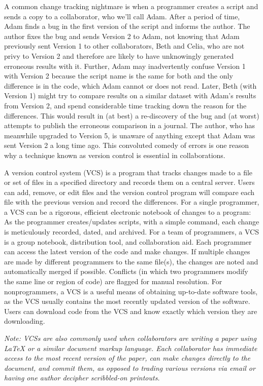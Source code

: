 \documentclass[ChapterTOCs,krantz2]{krantz} %
\begin{document}
A common change tracking nightmare 
is when a programmer creates a script 
and sends a copy to a collaborator, who we'll call Adam. After a period of time, 
Adam finds a bug in the first version of the script and informs
the author. The author fixes the bug and sends Version 2
to Adam, not knowing that Adam
previously sent Version 1 to other collaborators, Beth and Celia, who are not privy to Version 2 
and therefore are likely to have unknowingly generated erroneous results with it.  
Further, Adam may inadvertently confuse Version 1
with Version 2 because the script name is the same for both and
the only difference is in the code, which Adam cannot or does not read. Later, 
Beth (with Version 1) might try to compare
results on a similar dataset with Adam's results from Version 2,
and spend considerable time tracking down the reason for the differences.
This would result in (at best) a re-discovery of the bug and (at
worst) attempts to publish the erroneous comparison in a journal.  The author, 
who has meanwhile upgraded to Version 5, 
is unaware of anything except that 
Adam was sent Version 2 a long time ago.  This convoluted 
comedy of errors is one reason why a technique known as version control is essential in collaborations.

A version control system
(VCS) is a program that tracks changes made to a file or set of files in a specified
directory and records them on a central server. Users can add, remove,
or edit files and the version control program will compare each file
with the previous version and record the differences. For a single programmer,
a VCS can be a rigorous, efficient electronic notebook of changes to a program:  As the programmer
creates/updates scripts, with a simple command, each change is meticulously
recorded, dated, and archived.  For a team of programmers, a VCS
is a group notebook, distribution tool, and collaboration aid.  Each programmer can access the
latest version of the code and make changes.  If multiple changes are made by
different programmers to the same file(s), the changes are noted and automatically
merged if possible. Conflicts (in which two
programmers modify the same line or region of code) are flagged for manual resolution.  
For nonprogrammers, a VCS is a
useful means of obtaining up-to-date software tools, as the VCS usually contains the most 
recently updated version of the software.  Users can download code
from the VCS and know exactly which version they are downloading.

\textsl{Note: VCSs are also commonly used when collaborators are writing 
a paper using LaTeX or a similar document markup language.  Each collaborator 
has immediate access to the most recent version of the paper, can make 
changes directly to the document, and commit them, as opposed 
to trading various versions via email or having one author decipher scribbled-on 
printouts.}
\end{document}
